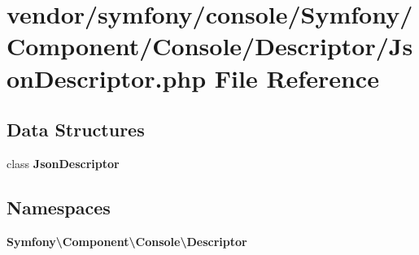 \section{vendor/symfony/console/\+Symfony/\+Component/\+Console/\+Descriptor/\+Json\+Descriptor.php File Reference}
\label{_json_descriptor_8php}
\subsection*{Data Structures}
\begin{DoxyCompactItemize}
\item 
class {\bf Json\+Descriptor}
\end{DoxyCompactItemize}
\subsection*{Namespaces}
\begin{DoxyCompactItemize}
\item 
 {\bf Symfony\textbackslash{}\+Component\textbackslash{}\+Console\textbackslash{}\+Descriptor}
\end{DoxyCompactItemize}
